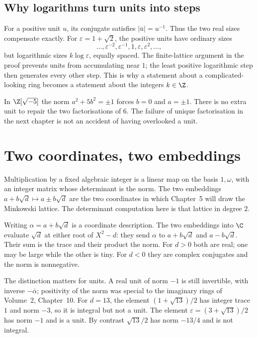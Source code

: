 \subsection*{Why logarithms turn units into steps}
For a positive unit $u$, its conjugate satisfies $|\bar u|=u^{-1}$.
Thus the two real sizes compensate exactly. For $\varepsilon=1+\sqrt2$,
the positive units have ordinary sizes
\[
\ldots,\varepsilon^{-2},\varepsilon^{-1},1,\varepsilon,
\varepsilon^2,\ldots,
\]
but logarithmic sizes $k\log\varepsilon$, equally spaced.
The finite-lattice argument in the proof prevents units from accumulating near
$1$; the least positive logarithmic step then generates every other step.
This is why a statement about a complicated-looking ring becomes a statement
about the integers $k\in\Z$.

\begin{examplex}
In $\Z[\sqrt{-5}]$ the norm $a^2+5b^2=\pm 1$ forces $b=0$ and $a=\pm 1$. There is no extra unit to repair the two factorisations of $6$. The failure of unique factorisation in the next chapter is not an accident of having overlooked a unit.
\end{examplex}

\section{Two coordinates, two embeddings}

Multiplication by a fixed algebraic integer is a linear map on the basis $1,\omega$, with an integer matrix whose determinant is the norm. The two embeddings $a+b\sqrt d\mapsto a\pm b\sqrt d$ are the two coordinates in which Chapter~5 will draw the Minkowski lattice. The determinant computation here is that lattice in degree $2$.

Writing $\alpha=a+b\sqrt d$ is a coordinate description.
The two embeddings into $\C$ evaluate $\sqrt d$ at either root
of $X^2-d$: they send $\alpha$ to $a+b\sqrt d$ and $a-b\sqrt d$.
Their sum is the trace and their product the norm.
For $d>0$ both are real; one may be large while the other is tiny.
For $d<0$ they are complex conjugates and the norm is nonnegative.

The distinction matters for units. A real unit of norm $-1$ is still
invertible, with inverse $-\bar\alpha$; positivity of the norm was special
to the imaginary rings of Volume~2, Chapter~10.
For $d=13$, the element $(1+\sqrt{13})/2$ has integer trace $1$ and norm
$-3$, so it is integral but not a unit. The element
$\varepsilon=(3+\sqrt{13})/2$ has norm $-1$ and is a unit.
By contrast $\sqrt{13}/2$ has norm $-13/4$ and is not integral.

